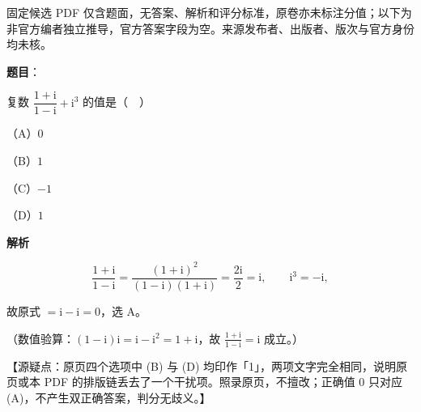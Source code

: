 

\begin{gktip}
固定候选 PDF 仅含题面，无答案、解析和评分标准，原卷亦未标注分值；以下为非官方编者独立推导，官方答案字段为空。来源发布者、出版者、版次与官方身份均未核。
\end{gktip}

\begin{answer}

\textbf{题目}：

复数 $\dfrac{1+\mathrm{i}}{1-\mathrm{i}}+\mathrm{i}^3$ 的值是（　）

（A）$0$

（B）$1$

（C）$-1$

（D）$1$

\textbf{解析}

\nopagebreak[4]
\[\frac{1+\mathrm{i}}{1-\mathrm{i}}=\frac{(1+\mathrm{i})^{2}}{(1-\mathrm{i})(1+\mathrm{i})}=\frac{2\mathrm{i}}{2}=\mathrm{i},\qquad \mathrm{i}^{3}=-\mathrm{i},\]

故原式 $=\mathrm{i}-\mathrm{i}=0$，选 A。

（数值验算：$(1-\mathrm{i})\mathrm{i}=\mathrm{i}-\mathrm{i}^{2}=1+\mathrm{i}$，故 $\frac{1+\mathrm{i}}{1-\mathrm{i}}=\mathrm{i}$ 成立。）

【源疑点：原页四个选项中 (B) 与 (D) 均印作「1」，两项文字完全相同，说明原页或本 PDF 的排版链丢去了一个干扰项。照录原页，不擅改；正确值 $0$ 只对应 (A)，不产生双正确答案，判分无歧义。】


\end{answer}
